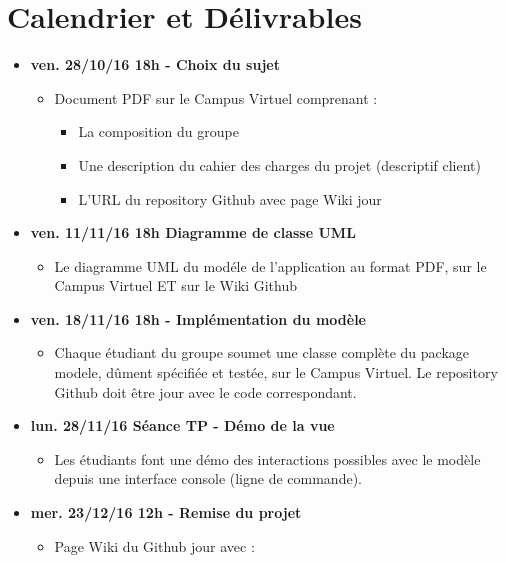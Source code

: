 \chapter*{Calendrier et Délivrables}
\label{chap:Calendrier et Délivrables}

\begin{itemize}
    \item  \textbf{ven. 28/10/16 18h - Choix du sujet} 
    \begin{itemize}
        \item Document PDF sur le Campus Virtuel comprenant :
        \begin{itemize}
            \item La composition du groupe
            \item Une description du cahier des charges du projet (descriptif client)
            \item L’URL du repository Github avec page Wiki jour
        \end{itemize}
    \end{itemize}
    \item \textbf{ven. 11/11/16 18h Diagramme de classe UML}
    \begin{itemize}
        \item Le diagramme UML du modéle de l’application au format PDF, sur le Campus Virtuel ET sur le Wiki Github
    \end{itemize}
    \item \textbf{ven. 18/11/16 18h - Implémentation du modèle}
    \begin{itemize}
        \item Chaque étudiant du groupe soumet une classe complète du package modele, dûment spécifiée et testée, sur le Campus Virtuel. Le repository Github doit être jour avec le code correspondant.
    \end{itemize}
    \item \textbf{lun. 28/11/16 Séance TP - Démo de la vue}
    \begin{itemize}
        \item Les étudiants font une démo des interactions possibles avec le modèle depuis une interface console (ligne de commande).
    \end{itemize}
     \item \textbf{mer. 23/12/16 12h - Remise du projet}
     \begin{itemize}
         \item Page Wiki du Github jour avec :

\end{itemize}
\end{itemize}
